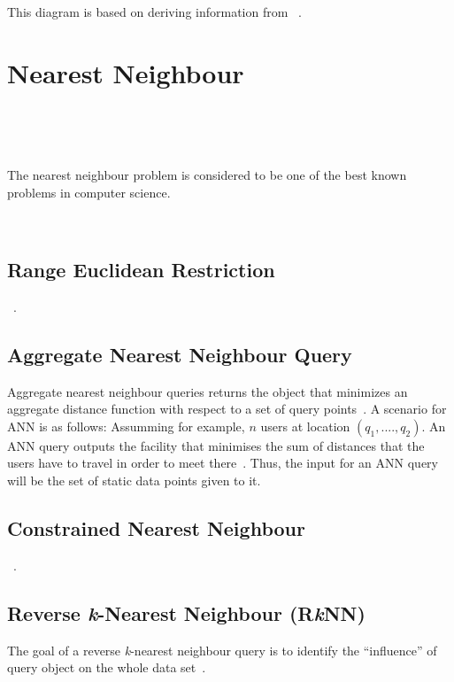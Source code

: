 \documentclass[a4paper,11pt]{article}
\begin{document}
This diagram is based on deriving information from ~\cite{taniar2013taxonomy}.

\section{Nearest Neighbour}

~\cite{jensen2003nearest}

~\cite{preparatat1985computational}

The nearest neighbour problem is considered to be one of the best known problems in computer science. 

~\cite{roussopoulos1995nearest}

\subsection{Range Euclidean Restriction}

~\cite{papadias2003query}. 

\subsection{Aggregate Nearest Neighbour Query}

Aggregate nearest neighbour queries returns the object that minimizes an aggregate distance function with respect to a set of query points~\cite{yiu2005aggregate}. A scenario for ANN is as follows: Assumming for example, $n$ users at location $(q_1,....,q_2)$. An ANN query outputs the facility that minimises the sum of distances that the users have to travel in order to meet there~\cite{papadias2005aggregate}. Thus, the input for an ANN query will be the set of static data points given to it.

\subsection{Constrained Nearest Neighbour}

~\cite{ferhatosmanoglu2001constrained}.

\subsection{Reverse \textit{k}-Nearest Neighbour (R\textit{k}NN)}

The goal of a reverse \textit{k}-nearest neighbour query is to identify the ``influence'' of query object on the whole data set~\cite{achtert2006efficient}. 
\end{document}
